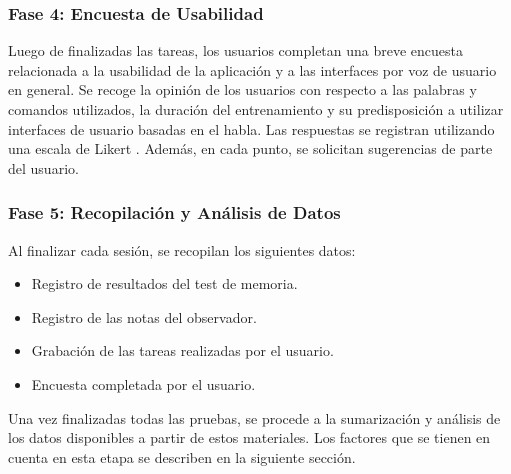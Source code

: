 \subsubsection{Fase 4: Encuesta de Usabilidad}
Luego de finalizadas las tareas, los usuarios completan una breve encuesta relacionada a la usabilidad de
la aplicaci\'on y a las interfaces por voz de usuario en general.
Se recoge la opini\'on de los usuarios con respecto a las palabras y comandos utilizados, la duraci\'on del
entrenamiento y su predisposici\'on a utilizar interfaces de usuario basadas en el habla. Las respuestas se
registran utilizando una escala de Likert \cite{Allen:2007}.
Adem\'as, en cada punto, se solicitan sugerencias de parte del usuario. 	

\subsubsection{Fase 5: Recopilaci\'on y An\'alisis de Datos} 
Al finalizar cada sesi\'on, se recopilan los siguientes datos:
	\begin{itemize}			
		\item Registro de resultados del test de memoria.
		\item Registro de las notas del observador.
		\item Grabaci\'on de las tareas realizadas por el usuario.
		\item Encuesta completada por el usuario.
	\end{itemize}

Una vez finalizadas todas las pruebas, se procede a la sumarizaci\'on y an\'alisis de los datos disponibles
a partir de estos materiales. Los factores que se tienen en cuenta en esta etapa se describen en la
siguiente secci\'on.

